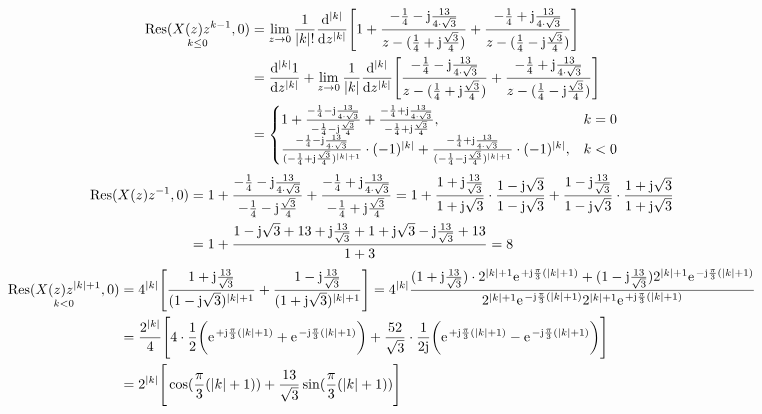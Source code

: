 \documentclass[11pt,a4paper,DIV=12]{scrartcl}
\begin{document}
\begin{align}
	\underset{k\leq0}{\mathrm{Res}(X(z)z^{k-1},0)}&=\lim\limits_{z\rightarrow0}\frac{1}{|k|!}\frac{\mathrm{d}^{|k|}}{\mathrm{d}z^{|k|}}\Bigg [1+\frac{-\frac{1}{4}-\im\frac{13}{4\cdot\sqrt{3}}}{z-(\frac{1}{4}+\im\frac{\sqrt{3}}{4})}+\frac{-\frac{1}{4}+\im\frac{13}{4\cdot\sqrt{3}}}{z-(\frac{1}{4}-\im\frac{\sqrt{3}}{4})}\Bigg]\nonumber\\
	&=\frac{\mathrm{d}^{|k|}1}{\mathrm{d}z^{|k|}}+\lim\limits_{z\rightarrow0}\frac{1}{|k|}\frac{\mathrm{d}^{|k|}}{\mathrm{d}z^{|k|}}\Bigg[\frac{-\frac{1}{4}-\im\frac{13}{4\cdot\sqrt{3}}}{z-(\frac{1}{4}+\im\frac{\sqrt{3}}{4})}+\frac{-\frac{1}{4}+\im\frac{13}{4\cdot\sqrt{3}}}{z-(\frac{1}{4}-\im\frac{\sqrt{3}}{4})}\Bigg] \nonumber \\
	&=\begin{cases}
		1+\frac{-\frac{1}{4}-\im\frac{13}{4\cdot\sqrt{3}}}{-\frac{1}{4}-\im\frac{\sqrt{3}}{4}}+\frac{-\frac{1}{4}+\im\frac{13}{4\cdot\sqrt{3}}}{-\frac{1}{4}+\im\frac{\sqrt{3}}{4}}, &k = 0 \\
		\frac{-\frac{1}{4}-\im\frac{13}{4\cdot\sqrt{3}}}{(-\frac{1}{4}+\im\frac{\sqrt{3}}{4})^{|k|+1}}\cdot(-1)^{|k|}+\frac{-\frac{1}{4}+\im\frac{13}{4\cdot\sqrt{3}}}{(-\frac{1}{4}-\im\frac{\sqrt{3}}{4})^{|k|+1}}\cdot(-1)^{|k|}, &k <0
	\end{cases}
\end{align}
\begin{align}
		\mathrm{Res}(X(z)z^{-1},0)&= 1+\frac{-\frac{1}{4}-\im\frac{13}{4\cdot\sqrt{3}}}{-\frac{1}{4}-\im\frac{\sqrt{3}}{4}}+\frac{-\frac{1}{4}+\im\frac{13}{4\cdot\sqrt{3}}}{-\frac{1}{4}+\im\frac{\sqrt{3}}{4}}=1+\frac{1+\im\frac{13}{\sqrt{3}}}{1+\im\sqrt{3}}\cdot\frac{1-\im\sqrt{3}}{1-\im\sqrt{3}}+\frac{1-\im\frac{13}{\sqrt{3}}}{1-\im\sqrt{3}}\cdot\frac{1+\im\sqrt{3}}{1+\im\sqrt{3}}\nonumber\\
		&=1+\frac{1-\im\sqrt{3}+13+\im\frac{13}{\sqrt{3}}+1+\im\sqrt{3}-\im\frac{13}{\sqrt{3}}+13}{1+3}=8
\end{align}
\begin{align}
	\underset{k<0}{\mathrm{Res}(X(z)z^{|k|+1},0)}&=4^{|k|}\Bigg[\frac{1+\im\frac{13}{\sqrt{3}}}{(1-\im\sqrt{3})^{|k|+1}}+\frac{1-\im\frac{13}{\sqrt{3}}}{(1+\im\sqrt{3})^{|k|+1}} \Bigg]=4^{|k|}\frac{(1+\im\frac{13}{\sqrt{3}})\cdot2^{|k|+1}\e^{+\im\frac{\pi}{3}(|k|+1)}+(1-\im\frac{13}{\sqrt{3}})2^{|k|+1}\e^{-\im\frac{\pi}{3}(|k|+1)}}{2^{|k|+1}\e^{-\im\frac{\pi}{3}(|k|+1)}2^{|k|+1}\e^{+\im\frac{\pi}{3}(|k|+1)}}\nonumber\\
	&=\frac{2^{|k|}}{4}\Bigg [4\cdot\frac{1}{2}\bigg(\e^{+\im\frac{\pi}{3}(|k|+1)}+\e^{-\im\frac{\pi}{3}(|k|+1)}\bigg)+\frac{52}{\sqrt{3}}\cdot\frac{1}{2\im}\bigg(\e^{+\im\frac{\pi}{3}(|k|+1)}-\e^{-\im\frac{\pi}{3}(|k|+1)}\bigg)\Bigg]\nonumber\\
	&=2^{|k|}\Bigg[\cos(\frac{\pi}{3}(|k|+1))+\frac{13}{\sqrt{3}}\sin(\frac{\pi}{3}(|k|+1))\Bigg]
\end{align}
\end{document}
